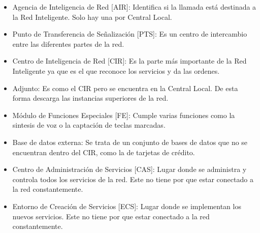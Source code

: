 \begin{itemize}
\item Agencia de Inteligencia de Red [\acrshort{AIR}]: Identifica si la llamada está destinada a la Red Inteligente. Solo hay una por Central Local.
\item Punto de Transferencia de Señalización [\acrshort{PTS}]: Es un centro de intercambio entre las diferentes partes de la red.
\item Centro de Inteligencia de Red [\acrshort{CIR}]: Es la parte más importante de la Red Inteligente ya que es el que reconoce los servicios y da las ordenes.
\item Adjunto: Es como el \acrshort{CIR} pero se encuentra en la Central Local. De esta forma descarga las instancias superiores de la red.
\item Módulo de Funciones Especiales [FE]: Cumple varias funciones como la sintesis de voz o la captación de teclas marcadas.
\item Base de datos externa: Se trata de un conjunto de bases de datos que no se encuentran dentro del \acrshort{CIR}, como la de tarjetas de crédito.
\item Centro de Administración de Servicios [\acrshort{CAS}]: Lugar donde se administra y controla todos los servicios de la red. Este no tiene por que estar conectado a la red constantemente.
\item Entorno de Creación de Servicios [\acrshort{ECS}]: Lugar donde se implementan los nuevos servicios. Este no tiene por que estar conectado a la red constantemente.
\end{itemize}